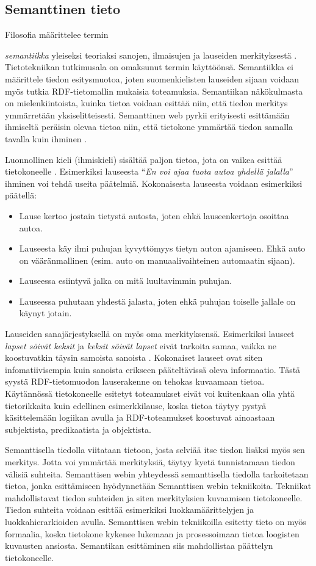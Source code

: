 \documentclass[finnish, 12pt, a4paper, elec, utf8, pdfa, online]{aaltothesis}
\begin{document}
\subsection{Semanttinen tieto}
Filosofia määrittelee termin {\textit{semantiikka} yleiseksi teoriaksi sanojen, ilmaisujen ja lauseiden merkityksestä \cite{semantics_phi}. Tietotekniikan tutkimusala on omaksunut termin käyttöönsä. Semantiikka ei määrittele tiedon esitysmuotoa, joten suomenkielisten lauseiden sijaan voidaan myös tutkia RDF-tietomallin mukaisia toteamuksia. Semantiikan näkökulmasta on mielenkiintoista, kuinka tietoa voidaan esittää niin, että tiedon merkitys ymmärretään yksiselitteisesti. Semanttinen web pyrkii erityisesti esittämään ihmiseltä peräisin olevaa tietoa niin, että tietokone ymmärtää tiedon samalla tavalla kuin ihminen \cite{Berners_visio}.

Luonnollinen kieli (ihmiskieli) sisältää paljon tietoa, jota on vaikea esittää tietokoneelle \cite{semantics}. Esimerkiksi lauseesta ``\textit{En voi ajaa tuota autoa yhdellä jalalla}'' ihminen voi tehdä useita päätelmiä. Kokonaisesta lauseesta voidaan esimerkiksi päätellä:
\begin{itemize}
  \item  Lause kertoo jostain tietystä autosta, joten ehkä lauseenkertoja osoittaa autoa.
  \item  Lauseesta käy ilmi puhujan kyvyttömyys tietyn auton ajamiseen. Ehkä auto on vääränmallinen (esim. auto on manuaalivaihteinen automaatin sijaan).
  \item  Lauseessa esiintyvä jalka on mitä luultavimmin puhujan.
  \item  Lauseessa puhutaan yhdestä jalasta, joten ehkä puhujan toiselle jallale on käynyt jotain.
\end{itemize}
Lauseiden sanajärjestyksellä on myös oma merkityksensä. Esimerkiksi lauseet \textit{lapset söivät keksit} ja \textit{keksit söivät lapset} eivät tarkoita samaa, vaikka ne koostuvatkin täysin samoista sanoista \cite{semantics}. Kokonaiset lauseet ovat siten infomatiivisempia kuin sanoista erikseen pääteltävissä oleva informaatio. Tästä syystä RDF-tietomuodon lauserakenne on tehokas kuvaamaan tietoa. Käytännössä tietokoneelle esitetyt toteamukset eivät voi kuitenkaan olla yhtä tietorikkaita kuin edellinen esimerkkilause, koska tietoa täytyy pystyä käsittelemään logiikan avulla ja RDF-toteamukset koostuvat ainoastaan subjektista, predikaatista ja objektista.

Semanttisella tiedolla viitataan tietoon, josta selviää itse tiedon lisäksi myös sen merkitys. Jotta voi ymmärtää merkityksiä, täytyy kyetä tunnistamaan tiedon välisiä suhteita. Semanttisen webin yhteydessä semanttisella tiedolla tarkoitetaan tietoa, jonka esittämiseen hyödynnetään Semanttisen webin tekniikoita. Tekniikat mahdollistavat tiedon suhteiden ja siten merkityksien kuvaamisen tietokoneelle. Tiedon suhteita voidaan esittää esimerkiksi luokkamäärittelyjen ja luokkahierarkioiden avulla. Semanttisen webin tekniikoilla esitetty tieto on myös formaalia, koska tietokone kykenee lukemaan ja prosessoimaan tietoa loogisten kuvausten ansiosta. Semantikan esittäminen siis mahdollistaa päättelyn tietokoneelle.


}
\end{document}
